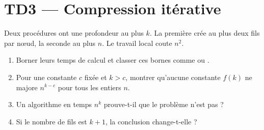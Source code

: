 \section{TD3 --- Compression itérative}\label{sec:td3-compression}

\begin{td-exo}
    Deux procédures ont une profondeur au plus \(k\).
    La première crée au plus deux fils par nœud, la seconde au plus \(n\).
    Le travail local coute \(n^2\).

    \begin{enumerate}
        \item Borner leurs temps de calcul et classer ces bornes comme  ou .

        \item Pour une constante \(c\) fixée et \(k > c\), montrer qu'aucune constante \(f(k)\) ne majore \(n^{k-c}\) pour tous les entiers \(n\).

        \item Un algorithme en temps \(n^k\) prouve-t-il que le problème n'est pas  ?

        \item Si le nombre de fils est \(k + 1\), la conclusion change-t-elle ?
    \end{enumerate}
\end{td-exo}

